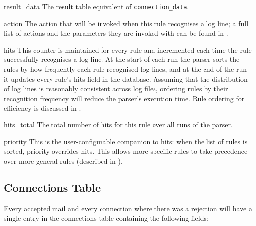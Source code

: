 \begin{boldeqlist}
    \item [result\_data] The result table equivalent of
        \texttt{connection\_data}.

    \item [action] The action that will be invoked when this rule
        recognises a log line; a full list of actions and the parameters
        they are invoked with can be found in .

    \item [hits] This counter is maintained for every rule and incremented
        each time the rule successfully recognises a log line.  At the
        start of each run the parser sorts the rules by how frequently each
        rule recognised log lines, and at the end of the run it updates
        every rule's hits field in the database.  Assuming that the
        distribution of log lines is reasonably consistent across log
        files, ordering rules by their recognition frequency will reduce
        the parser's execution time.  Rule ordering for efficiency is
        discussed in .

    \item [hits\_total] The total number of hits for this rule over all
        runs of the parser.

    \item [priority] This is the user-configurable companion to hits: when
        the list of rules is sorted, priority overrides hits.  This allows
        more specific rules to take precedence over more general rules
        (described in ).

\end{boldeqlist}

\subsection{Connections Table}

\label{connections table}

Every accepted mail and every connection where there was a rejection will
have a single entry in the connections table containing the following
fields:

